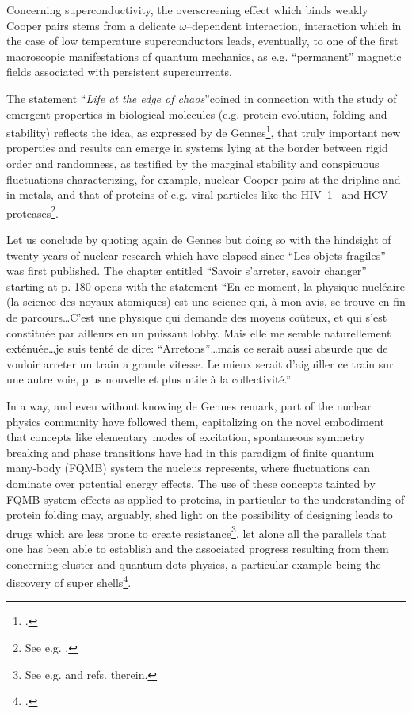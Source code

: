 \begin{subappendices}
Concerning superconductivity, the overscreening effect which binds weakly Cooper pairs stems from a delicate $\omega$--dependent interaction, interaction which in the case of low temperature superconductors leads, eventually, to one of the first macroscopic manifestations of quantum mechanics, as e.g. ``permanent'' magnetic fields associated with persistent  supercurrents.

The statement ``\textit{Life at the edge of chaos}''coined in connection with the study of emergent properties in biological molecules (e.g. protein evolution, folding and stability) reflects the idea, as expressed by de Gennes\footnote{\cite{deGennes:94}.}, that truly important new properties and results can emerge in systems lying at the border between rigid order and randomness, as testified by the marginal stability and conspicuous fluctuations characterizing, for example, nuclear Cooper pairs at the dripline and in metals, and that of proteins of e.g.  viral particles like the HIV--1-- and HCV--proteases\footnote{See e.g. \cite{Broglia:13b}.}.


 Let us conclude by quoting again de Gennes but doing so with the hindsight of twenty years of nuclear research which have elapsed since ``Les objets fragiles'' was first published. The chapter entitled  ``Savoir s'arreter, savoir changer'' starting at p. 180 opens with the statement ``En ce moment, la physique nucl\'eaire (la science des noyaux atomiques) est une science qui, \`a mon avis, se trouve en fin de parcours\dots C'est une physique qui demande des moyens co\^uteux, et qui s'est constitu\'ee par ailleurs en un puissant lobby. Mais elle me semble naturellement ext\'enu\'ee\dots je suis tent\'e de dire: ``Arretons''\dots mais ce serait aussi absurde que de vouloir arreter un train a grande vitesse. Le mieux serait d'aiguiller ce train sur une autre voie, plus nouvelle et plus utile \`a la collectivit\'e.''


In a way, and even without knowing de Gennes remark, part of the nuclear physics community have followed them, capitalizing on the novel embodiment that concepts like elementary modes of excitation, spontaneous symmetry breaking and phase transitions have had in this paradigm of finite quantum many-body (FQMB) system the nucleus represents, where fluctuations can dominate over potential energy effects. The use of these concepts tainted by  FQMB system effects as applied to proteins, in particular to the understanding of protein folding may, arguably, shed light on the possibility of designing leads to  drugs which are less prone to create resistance\footnote{See e.g. \cite{Broglia:13b,Broglia:05,Rosner:17} and refs. therein.}, let alone all the parallels that one has been able to establish and the associated progress resulting from them concerning cluster and quantum dots physics, a particular example being the discovery of super shells\footnote{\cite{Pedersen:91,deHeer:87,Brack:93,Pacheco:91,Lipparini:03,Martin:94,Bjornholm:94}.}.








\end{subappendices}
